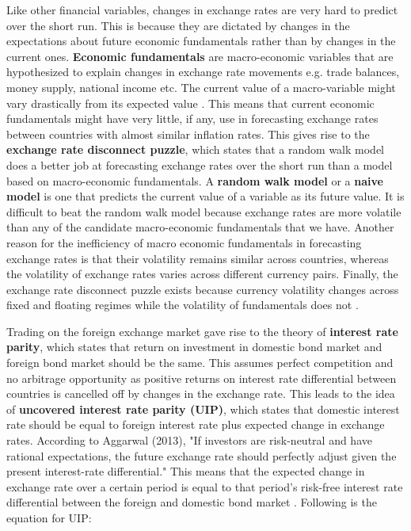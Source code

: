 \documentclass[12pt, a4paper]{report}
\begin{document}
\vspace*{4mm}

Like other financial variables, changes in exchange rates are very hard to predict over the short run. This is because they are dictated by changes in the expectations about future economic fundamentals rather than by changes in the current ones. \textbf{Economic fundamentals} are macro-economic variables that are hypothesized to explain changes in exchange rate movements e.g. trade balances, money supply, national income etc. The current value of a macro-variable might vary drastically from its expected value \cite{wang2008exchange}. This means that current economic fundamentals might have very little, if any, use in forecasting exchange rates between countries with almost similar inflation rates. This gives rise to the \textbf{exchange rate disconnect puzzle}, which states that a random walk model does a better job at forecasting exchange rates over the short run than a model based on macro-economic fundamentals. A \textbf{random walk model} or a \textbf{naive model} is one that predicts the current value of a variable as its future value. It is difficult to beat the random walk model because exchange rates are more volatile than any of the candidate macro-economic fundamentals that we have. Another reason for the inefficiency of macro economic fundamentals in forecasting exchange rates is that their volatility remains similar across countries, whereas the volatility of exchange rates varies across different currency pairs. Finally, the exchange rate disconnect puzzle exists because currency volatility changes across fixed and floating regimes while the volatility of fundamentals does not \cite{meese1983empirical}.


\vspace*{4mm}

Trading on the foreign exchange market gave rise to the theory of \textbf{interest rate parity}, which states that return on investment in domestic bond market and foreign bond market should be the same. This assumes perfect competition and no arbitrage opportunity as positive returns on interest rate differential between countries is cancelled off by changes in the exchange rate. This leads to the idea of \textbf{uncovered interest rate parity (UIP)}, which states that domestic interest rate should be equal to foreign interest rate plus expected change in exchange rates. According to Aggarwal (2013), "If investors are risk-neutral and have rational expectations, the future exchange rate should perfectly adjust given the present interest-rate differential." This means that the expected change in exchange rate over a certain period is equal to that period's risk-free interest rate differential between the foreign and domestic bond market \cite{aggarwal2013uncovered}. Following is the equation for UIP:
\end{document}
